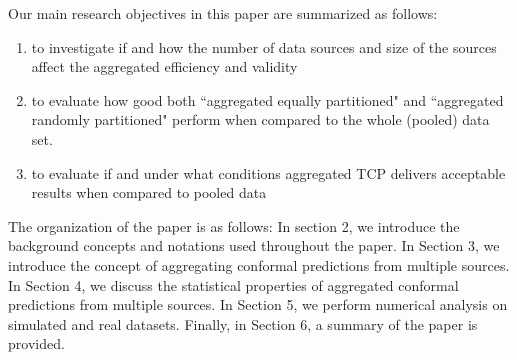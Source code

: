 \documentclass[main]{subfiles}
\newcommand{\todo}[1]{{\color{blue} #1 }}
\begin{document}

Our main research objectives in this paper are summarized as follows:

\begin{enumerate}
\item to investigate if and how the number of data sources and size of the sources affect the aggregated efficiency and validity

\item to evaluate how good both ``aggregated equally partitioned" and ``aggregated randomly partitioned" perform when compared to the whole (pooled) data set.

\item to evaluate if and under what conditions aggregated TCP delivers acceptable results when compared to pooled data



\end{enumerate}

The organization of the paper is as follows: In section 2, we introduce the background concepts and notations used throughout the paper. In Section 3, we introduce the concept of aggregating conformal predictions from multiple sources. In Section 4, we discuss the statistical properties of aggregated conformal predictions from multiple sources. In Section 5, we perform numerical analysis on simulated and real datasets. Finally, in Section 6, a summary of the paper is provided.
\end{document}
